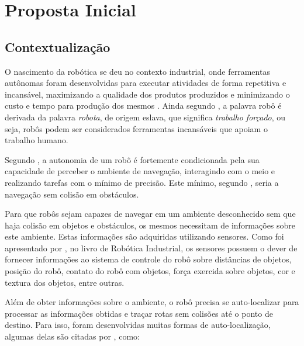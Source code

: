 
\chapter[Proposta Inicial]{Proposta Inicial}

\section{Contextualização}
	
	O nascimento da robótica se deu no contexto industrial, onde ferramentas autônomas foram desenvolvidas para executar atividades de forma repetitiva e incansável, maximizando a qualidade dos produtos produzidos e minimizando o custo e tempo para produção dos mesmos \cite{roboticaIndustrial}. Ainda segundo \cite{roboticaIndustrial}, a palavra robô é derivada da palavra \textit{robota}, de origem eslava, que significa \textit{trabalho forçado}, ou seja, robôs podem ser considerados ferramentas incansáveis que apoiam o trabalho humano. 

	Segundo \cite{localizacaoEMapeamentoPaulo}, a autonomia de um robô é fortemente condicionada pela sua capacidade de perceber o ambiente de navegação, interagindo com o meio e realizando tarefas com o mínimo de precisão. Este mínimo, segundo \cite{localizacaoEMapeamentoPaulo}, seria a navegação sem colisão em obstáculos. 

	Para que robôs sejam capazes de navegar em um ambiente desconhecido sem que haja colisão em objetos e obstáculos, os mesmos necessitam de informações sobre este ambiente. Estas informações são adquiridas utilizando sensores. Como foi apresentado por \cite{interacaoRoboAmbiente}, no livro de Robótica Industrial, os sensores possuem o dever de fornecer informações ao sistema de controle do robô sobre distâncias de objetos, posição do robô, contato do robô com objetos, força exercida sobre objetos, cor e textura dos objetos, entre outras.

	Além de obter informações sobre o ambiente, o robô precisa se auto-localizar para processar as informações obtidas e traçar rotas sem colisões até o ponto de destino. Para isso, foram desenvolvidas muitas formas de auto-localização, algumas delas são citadas por \cite{roboBulldozerIV}, como:

